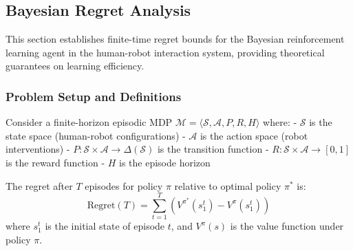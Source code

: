 \subsection{Bayesian Regret Analysis}

This section establishes finite-time regret bounds for the Bayesian reinforcement learning agent in the human-robot interaction system, providing theoretical guarantees on learning efficiency.

\subsubsection{Problem Setup and Definitions}

Consider a finite-horizon episodic MDP $\mathcal{M} = \langle \mathcal{S}, \mathcal{A}, P, R, H \rangle$ where:
- $\mathcal{S}$ is the state space (human-robot configurations)
- $\mathcal{A}$ is the action space (robot interventions)
- $P: \mathcal{S} \times \mathcal{A} \rightarrow \Delta(\mathcal{S})$ is the transition function
- $R: \mathcal{S} \times \mathcal{A} \rightarrow [0, 1]$ is the reward function  
- $H$ is the episode horizon

\begin{definition}[Regret]
\label{def:regret}
The regret after $T$ episodes for policy $\pi$ relative to optimal policy $\pi^*$ is:
$$\text{Regret}(T) = \sum_{t=1}^T \left(V^{\pi^*}(s_1^t) - V^{\pi}(s_1^t)\right)$$
where $s_1^t$ is the initial state of episode $t$, and $V^\pi(s)$ is the value function under policy $\pi$.
\end{definition}

